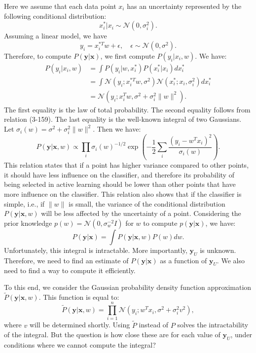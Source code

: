 \documentclass[12pt]{article}
\begin{document}
	Here we assume that each data point $x_i$ has an uncertainty represented by the following conditional distribution:
	\begin{equation}
		x_i^* | x_i \sim \mathcal{N}(0, \sigma_i^2).
	\end{equation}
	Assuming a linear model, we have
	\begin{equation}
		y_i = x_i^{*T} w + \epsilon, \quad \epsilon \sim \mathcal{N}(0, \sigma^2).
	\end{equation}
	Therefore, to compute $P(\mathbf{y}|\mathbf{x})$, we first compute $P(y_i | x_i, w)$. We have:
	\begin{align}
		P(y_i | x_i, w) &= \int P(y_i | w, x_i^*) P(x_i^* | x_i) dx_i^* \\
		&= \int \mathcal{N}(y_i; x_i^{*T} w, \sigma^2) \mathcal{N}(x_i^*; x_i, \sigma_i^2) dx_i^* \\
		&= \mathcal{N}(y_i; x_i^T w, \sigma^2 + \sigma_i^2 \|w\|^2).
	\end{align}
	The first equality is the law of total probability. The second equality follows from relation (3-159). The last equality is the well-known integral of two Gaussians. Let $\sigma_i(w) = \sigma^2 + \sigma_i^2 \|w\|^2$. Then we have:
	\begin{equation}
		P(\mathbf{y}|\mathbf{x}, w) \propto \prod_i \sigma_i(w)^{-1/2} \exp\left( -\frac{1}{2} \sum_i \frac{(y_i - w^T x_i)^2}{\sigma_i(w)} \right).
	\end{equation}
	This relation states that if a point has higher variance compared to other points, it should have less influence on the classifier, and therefore its probability of being selected in active learning should be lower than other points that have more influence on the classifier. This relation also shows that if the classifier is simple, i.e., if $\|w\|$ is small, the variance of the conditional distribution $P(\mathbf{y}|\mathbf{x}, w)$ will be less affected by the uncertainty of a point. Considering the prior knowledge $p(w) = \mathcal{N}(0, \sigma_w^{-2} I)$ for $w$ to compute $p(\mathbf{y}|\mathbf{x})$, we have:
	\begin{equation}
		P(\mathbf{y}|\mathbf{x}) = \int P(\mathbf{y}|\mathbf{x}, w) P(w) dw.
	\end{equation}
	Unfortunately, this integral is intractable. More importantly, $\mathbf{y}_U$ is unknown. Therefore, we need to find an estimate of $P(\mathbf{y}|\mathbf{x})$ as a function of $\mathbf{y}_U$. We also need to find a way to compute it efficiently.
	
	To this end, we consider the Gaussian probability density function approximation $\tilde{P}(\mathbf{y}|\mathbf{x}, w)$. This function is equal to:
	\begin{equation}
		\tilde{P}(\mathbf{y}|\mathbf{x}, w) = \prod_{i=1}^{n} \mathcal{N}(y_i; w^T x_i, \sigma^2 + \sigma_i^2 v^2),
	\end{equation}
	where $v$ will be determined shortly. Using $\tilde{P}$ instead of $P$ solves the intractability of the integral. But the question is how close these are for each value of $\mathbf{y}_U$, under conditions where we cannot compute the integral?
	
\end{document}

